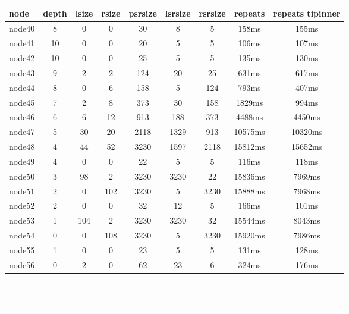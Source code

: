 \begin{tabular}{|l|c|c|c|c|c|c|c|c|}
\hline node & depth & lsize & rsize & psrsize & lsrsize & rsrsize   & repeats & repeats tipinner\\
    \hline node40 & 8 & 0 & 0 & 30 & 8 & 5 & 158ms & 155ms\\
    \hline node41 & 10 & 0 & 0 & 20 & 5 & 5 & 106ms & 107ms\\
    \hline node42 & 10 & 0 & 0 & 25 & 5 & 5 & 135ms & 130ms\\
    \hline node43 & 9 & 2 & 2 & 124 & 20 & 25 & 631ms & 617ms\\
    \hline node44 & 8 & 0 & 6 & 158 & 5 & 124 & 793ms & 407ms\\
    \hline node45 & 7 & 2 & 8 & 373 & 30 & 158 & 1829ms & 994ms\\
    \hline node46 & 6 & 6 & 12 & 913 & 188 & 373 & 4488ms & 4450ms\\
    \hline node47 & 5 & 30 & 20 & 2118 & 1329 & 913 & 10575ms & 10320ms\\
    \hline node48 & 4 & 44 & 52 & 3230 & 1597 & 2118 & 15812ms & 15652ms\\
    \hline node49 & 4 & 0 & 0 & 22 & 5 & 5 & 116ms & 118ms\\
    \hline node50 & 3 & 98 & 2 & 3230 & 3230 & 22 & 15836ms & 7969ms\\
    \hline node51 & 2 & 0 & 102 & 3230 & 5 & 3230 & 15888ms & 7968ms\\
    \hline node52 & 2 & 0 & 0 & 32 & 12 & 5 & 166ms & 101ms\\
    \hline node53 & 1 & 104 & 2 & 3230 & 3230 & 32 & 15544ms & 8043ms\\
    \hline node54 & 0 & 0 & 108 & 3230 & 5 & 3230 & 15920ms & 7986ms\\
    \hline node55 & 1 & 0 & 0 & 23 & 5 & 5 & 131ms & 128ms\\
    \hline node56 & 0 & 2 & 0 & 62 & 23 & 6 & 324ms & 176ms\\

\hline
\end{tabular} \

---

